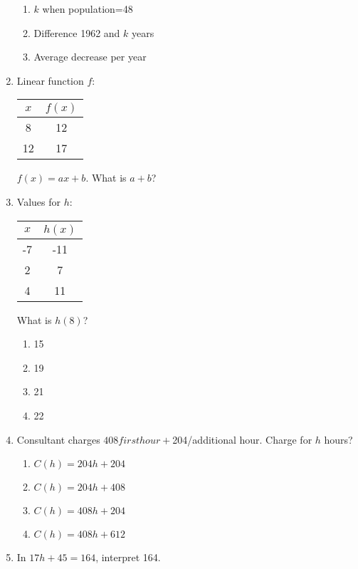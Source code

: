 \documentclass[12pt]{exam}
\begin{document}
\begin{enumerate}
\begin{enumerate}[label=\Alph*)]
        \item $k$ when population=48
        \item Difference 1962 and $k$ years
        \item Average decrease per year
    \end{enumerate}
    \item Linear function $f$:
    \begin{center}
        \begin{tabular}{|c|c|}
            \hline
            $x$ & $f(x)$ \\
            \hline
            8 & 12 \\
            12 & 17 \\
            \hline
        \end{tabular}
    \end{center}
    $f(x) = ax + b$. What is $a + b$?
    \item Values for $h$:
    \begin{center}
        \begin{tabular}{|c|c|}
            \hline
            $x$ & $h(x)$ \\
            \hline
            -7 & -11 \\
            2 & 7 \\
            4 & 11 \\
            \hline
        \end{tabular}
    \end{center}
    What is $h(8)$?
    \begin{enumerate}[label=\Alph*)]
        \item 15
        \item 19
        \item 21
        \item 22
    \end{enumerate}
    \item Consultant charges $408 first hour + $204/additional hour. Charge for $h$ hours?
    \begin{enumerate}[label=\Alph*)]
        \item $C(h) = 204h + 204$
        \item $C(h) = 204h + 408$
        \item $C(h) = 408h + 204$
        \item $C(h) = 408h + 612$
    \end{enumerate}
    \item In $17h + 45 = 164$, interpret 164.

\end{enumerate}
\end{document}
